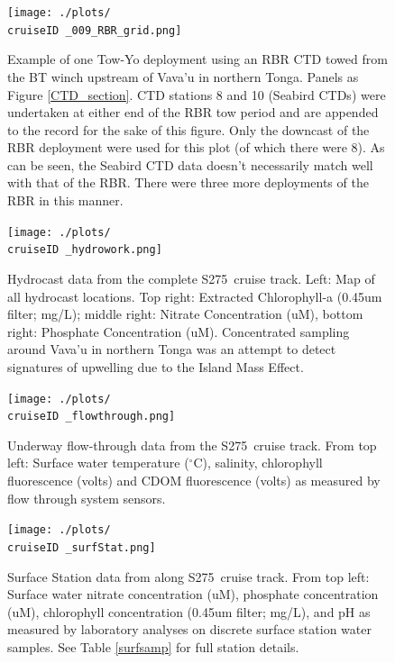 \documentclass[letterpaper,11pt]{article}
\newcommand{\cruiseID}{S275}
\begin{document}
\begin{figure}[ht]
\centering
\texttt{[image: ./plots/\\cruiseID \_009\_RBR\_grid.png]}
\caption[CTD data from RBR Tow-Yo]{Example of one Tow-Yo deployment using an RBR CTD towed from the BT winch upstream of Vava'u in northern Tonga. Panels as Figure \ref{CTD_section}. CTD stations 8 and 10 (Seabird CTDs) were undertaken at either end of the RBR tow period and are appended to the record for the sake of this figure. Only the downcast of the RBR deployment were used for this plot (of which there were 8). As can be seen, the Seabird CTD data doesn't necessarily match well with that of the RBR. There were three more deployments of the RBR in this manner.}
\label{CTD_RBR}
\end{figure}


\begin{figure}[t]
\centering
\texttt{[image: ./plots/\\cruiseID \_hydrowork.png]}
\caption[Hydrocast summary along \cruiseID\ cruise track]{Hydrocast data from the complete \cruiseID\ cruise track. Left: Map of all hydrocast locations. Top right: Extracted Chlorophyll-a (0.45um filter; mg/L); middle right: Nitrate Concentration (uM), bottom right: Phosphate Concentration (uM). Concentrated sampling around Vava'u in northern Tonga was an attempt to detect signatures of upwelling due to the Island Mass Effect.}
\label{hydrowork}
\end{figure}

\begin{figure}[t]
\centering
\texttt{[image: ./plots/\\cruiseID \_flowthrough.png]}
\caption[Underway flow-through data from the \cruiseID\ cruise track]{Underway flow-through data from the \cruiseID\ cruise track. From top left: Surface water temperature ($^{\circ}$C), salinity, chlorophyll fluorescence (volts) and CDOM fluorescence (volts) as measured by flow through system sensors.}
\label{hourly}
\end{figure}

\begin{figure}[t]
\centering
\texttt{[image: ./plots/\\cruiseID \_surfStat.png]}
\caption[Surface Station data from along \cruiseID\ cruise track]{Surface Station data from along \cruiseID\ cruise track. From top left: Surface water nitrate concentration (uM), phosphate concentration (uM), chlorophyll concentration (0.45um filter; mg/L), and pH as measured by laboratory analyses on discrete surface station water samples. See Table \ref{surfsamp} for full station details.}
\label{surfstat}
\end{figure}
\end{document}
